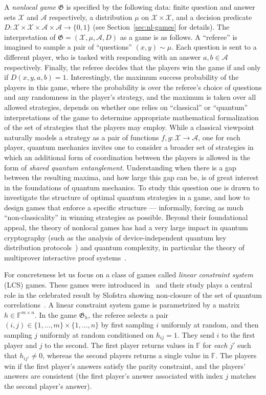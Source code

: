 \documentclass[11pt]{article}
\theoremstyle{definition}
\newcommand{\F}{\ensuremath{\mathbb{F}}}
\newcommand{\mA}{\ensuremath{\mathcal{A}}}
\newcommand{\mX}{\ensuremath{\mathcal{X}}}
\newcommand{\game}{\mathfrak{G}}
\begin{document}
 A \emph{nonlocal game} $\game$ is specified by the following data: finite question and answer sets $\mX$ and $\mA$ respectively, a distribution $\mu$ on $\mX\times \mX$, and a decision predicate $D:\mX\times \mX\times \mA\times \mA\to \{0,1\}$ (see Section~\ref{sec:nl-games} for details). The interpretation of $\game=(\mX,\mu,\mA,D)$ as a game is as follows. A ``referee'' is imagined to sample a pair of ``questions'' $(x,y)\sim \mu$. Each question is sent to a different player, who is tasked with responding with an answer $a,b\in \mA$ respectively. Finally, the referee decides that the players win the game if and only if $D(x,y,a,b)=1$. Interestingly, the maximum success probability of the players in this game, where the probability is over the referee's choice of questions and any randomness in the player's strategy, and the maximum is taken over all allowed strategies, depends on whether one relies on ``classical'' or ``quantum'' interpretations of the game to determine appropriate mathematical formalization of the set of strategies that the players may employ. While a classical viewpoint naturally models a strategy as a pair of functions $f,g:\mX\to\mA$, one for each player, quantum mechanics invites one to consider a broader set of strategies in which an additional form of coordination between the players is allowed in the form of \emph{shared quantum entanglement}. Understanding when there is a gap between the resulting maxima, and how large this gap can be, is of great interest in the foundations of quantum mechanics. To study this question one is drawn to investigate the structure of optimal quantum strategies in a game, and how to design games that enforce a specific structure --- informally, forcing as much ``non-classicality'' in winning strategies as possible. Beyond their foundational appeal, the theory of nonlocal games has had a very large impact in quantum cryptography (such as the analysis of device-independent quantum key distribution protocols~\cite{vazirani2019fully,arnon2019simple}) and quantum complexity, in particular the theory of multiprover interactive proof systems~\cite{cleve2004consequences}.

For concreteness let us focus on a class of games called \emph{linear constraint system} (LCS) games. These games were introduced in~\cite{cleve2014characterization} and their study plays a central role in the celebrated result by Slofstra showing non-closure of the set of quantum correlations~\cite{slofstra2019set}. A linear constraint system game is parametrized by a matrix $h\in \F^{m\times n}$. In the game $\game_h$, the referee selects a pair $(i,j)\in \{1,\ldots,m\}\times\{1,\ldots,n\}$ by first sampling $i$ uniformly at random, and then sampling $j$ uniformly at random conditioned on $h_{ij}=1$. They send $i$ to the first player and $j$ to the second. The first player returns values in $\F$ for \emph{each} $j'$ such that $h_{ij'}\neq 0$, whereas the second players returns a single value in $\F$. The players win if the first player's answers satisfy the parity constraint, and the players' answers are consistent (the first player's answer associated with index $j$ matches the second player's answer). 
\end{document}
